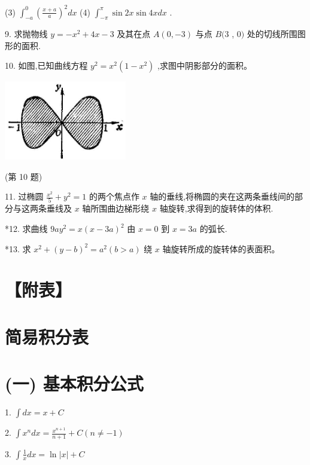\documentclass[10pt]{article}
\begin{document}
(3) \({\int }_{-a}^{0}{\left( \frac{x + a}{a}\right) }^{2}{dx}\) (4) \({\int }_{-\pi }^{\pi }\sin {2x}\sin {4xdx}\) .

9. 求抛物线 \(y = - {x}^{2} + {4x} - 3\) 及其在点 \(A\left( {0, - 3}\right)\) 与点 \(B(3\) , \(0)\) 处的切线所围图形的面积.

10. 如图,已知曲线方程 \({y}^{2} = {x}^{2}\left( {1 - {x}^{2}}\right)\) ,求图中阴影部分的面积。

\begin{center}
\includegraphics[max width=0.4\textwidth]{images/01912c18-5c3f-733d-b775-749ba9897a9d_253_827563.jpg}
\end{center}

(第 10 题)

11. 过椭圆 \(\frac{{x}^{2}}{5} + {y}^{2} = 1\) 的两个焦点作 \(x\) 轴的垂线,将椭圆的夹在这两条垂线间的部分与这两条垂线及 \(x\) 轴所围曲边梯形绕 \(x\) 轴旋转,求得到的旋转体的体积.

*12. 求曲线 \({9a}{y}^{2} = x{\left( x - 3a\right) }^{2}\) 由 \(x = 0\) 到 \(x = {3a}\) 的弧长.

*13. 求 \({x}^{2} + {\left( y - b\right) }^{2} = {a}^{2}\left( {b > a}\right)\) 绕 \(x\) 轴旋转所成的旋转体的表面积。

\section*{【附表】}

\section*{简易积分表}

\section*{(一) 基本积分公式}

1. \(\int {dx} = x + C\)

2. \(\int {x}^{n}{dx} = \frac{{x}^{n + 1}}{n + 1} + C\left( {n \neq - 1}\right)\)

3. \(\int \frac{1}{x}{dx} = \ln \left| x\right| + C\)
\end{document}
